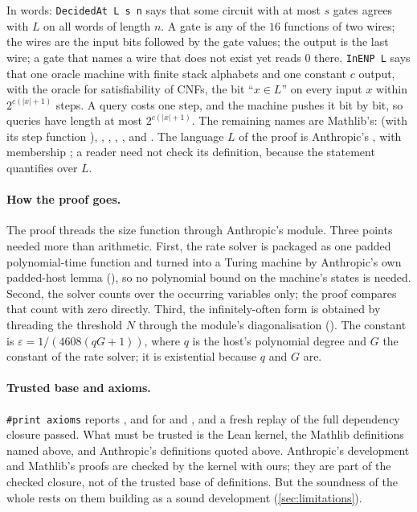 \documentclass[10pt]{amsart}
\theoremstyle{plain}
\theoremstyle{definition}
\theoremstyle{remark}
\numberwithin{equation}{section}
\begin{document}
In words: \texttt{DecidedAt L s n} says that some circuit with at most $s$ gates agrees with $L$ on
all words of length $n$. A gate is any of the $16$ functions of two wires; the wires are the input
bits followed by the gate values; the output is the last wire; a gate that names a wire that does
not exist yet reads $0$ there. \texttt{InENP L} says that one oracle machine with finite stack
alphabets and one constant $c$ output, with the oracle  for satisfiability of CNFs, the
bit ``$x\in L$'' on every input $x$ within $2^{c(|x|+1)}$ steps. A query costs one step, and the
machine pushes it bit by bit, so queries have length at most $2^{c(|x|+1)}$. The remaining names are
Mathlib's:  (with its step function ), , , ,
,  and . The language $L$ of the proof is
Anthropic's , with membership ; a reader
need not check its definition, because the statement quantifies over $L$.

\paragraph{How the proof goes.} The proof threads the size function through Anthropic's module.
Three points needed more than arithmetic. First, the rate solver is packaged as one padded
polynomial-time function and turned into a Turing machine by Anthropic's own padded-host lemma
(), so no polynomial bound on the machine's states is needed.
Second, the solver counts over the occurring variables only; the proof compares that count with zero
directly. Third, the infinitely-often form is obtained by threading the threshold $N$ through the
module's diagonalisation (). The constant is
$\varepsilon = 1/(4608(qG+1))$, where $q$ is the host's polynomial degree and $G$ the constant of the
rate solver; it is existential because $q$ and $G$ are.

\paragraph{Trusted base and axioms.} \texttt{\#print axioms} reports ,
 and  for  and
, and a fresh  replay of the full dependency
closure passed. What must be trusted is the Lean kernel, the Mathlib definitions named above, and
Anthropic's definitions quoted above. Anthropic's development and Mathlib's proofs are checked by the
kernel with ours; they are part of the checked closure, not of the trusted base of definitions. But
the soundness of the whole rests on them building as a sound development
(\cref{sec:limitations}).
\end{document}
